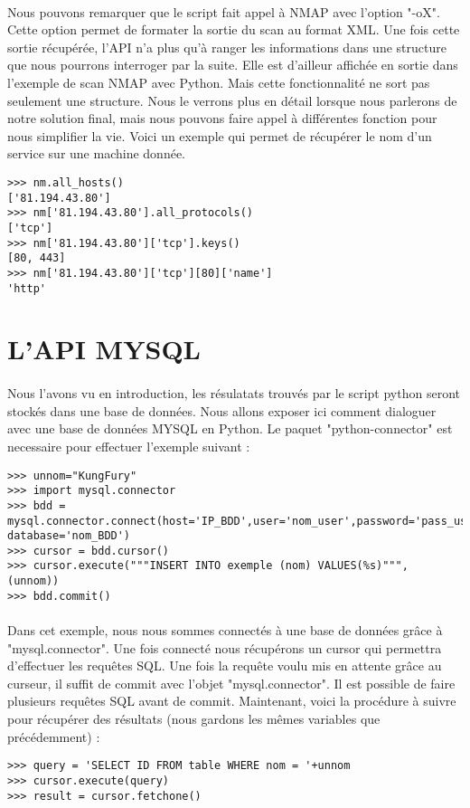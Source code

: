 \documentclass[12pt]{report}
\begin{document}
			\paragraph{}
				Nous pouvons remarquer que le script fait appel à NMAP avec l'option "-oX". Cette option permet de formater la sortie du scan au format XML. Une fois cette sortie récupérée, l'API n'a plus qu'à ranger les informations dans une structure que nous pourrons interroger par la suite. Elle est d'ailleur affichée en sortie dans l'exemple de scan NMAP avec Python. Mais cette fonctionnalité ne sort pas seulement une structure. Nous le verrons plus en détail lorsque nous parlerons de notre solution final, mais nous pouvons faire appel à différentes fonction pour nous simplifier la vie. Voici un exemple qui permet de récupérer le nom d'un service sur une machine donnée.
				\begin{lstlisting}[caption=Récupération du nom d'un service, captionpos=b]
>>> nm.all_hosts()
['81.194.43.80']
>>> nm['81.194.43.80'].all_protocols()
['tcp']
>>> nm['81.194.43.80']['tcp'].keys()
[80, 443]
>>> nm['81.194.43.80']['tcp'][80]['name']
'http'
				\end{lstlisting}
		\section{L'API MYSQL}
			\paragraph{}
				Nous l'avons vu en introduction, les résulatats trouvés par le script python seront stockés dans une base de données. Nous allons exposer ici comment dialoguer avec une base de données MYSQL en Python. Le paquet "python-connector" est necessaire pour effectuer l'exemple suivant :
				\begin{lstlisting}[caption=Connexion à une base de données et insertion de données, captionpos=b]
>>> unnom="KungFury"
>>> import mysql.connector
>>> bdd = mysql.connector.connect(host='IP_BDD',user='nom_user',password='pass_user', database='nom_BDD')
>>> cursor = bdd.cursor()
>>> cursor.execute("""INSERT INTO exemple (nom) VALUES(%s)""", (unnom))
>>> bdd.commit()
				\end{lstlisting}
			\paragraph{}
				Dans cet exemple, nous nous sommes connectés à une base de données grâce à "mysql.connector". Une fois connecté nous récupérons un cursor qui permettra d'effectuer les requêtes SQL. Une fois la requête voulu mis en attente grâce au curseur, il suffit de commit avec l'objet "mysql.connector". Il est possible de faire plusieurs requêtes SQL avant de commit. Maintenant, voici la procédure à suivre pour récupérer des résultats (nous gardons les mêmes variables que précédemment) :
				\begin{lstlisting}[caption=Récupérationd de données, captionpos=b]
>>> query = 'SELECT ID FROM table WHERE nom = '+unnom
>>> cursor.execute(query)
>>> result = cursor.fetchone()
				\end{lstlisting}
\end{document}
